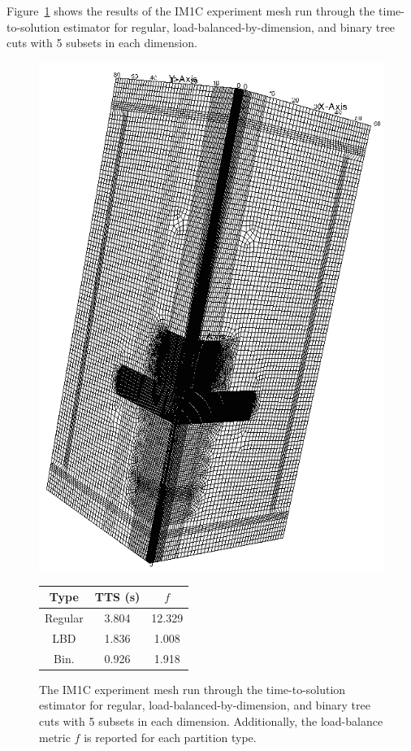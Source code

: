 Figure~\ref{im1c_opt} shows the results of the IM1C experiment mesh run through the time-to-solution estimator for regular, load-balanced-by-dimension, and binary tree cuts with 5 subsets in each dimension.
\begin{figure}[ht]
\begin{minipage}[c]{0.65\textwidth}
\centering
\includegraphics[scale=0.3]{../figures/im1_mesh.png}
\end{minipage}
%
\begin{minipage}[c]{0.33\textwidth}
\centering
\begin{table}[H]
\centering
\begin{tabular}{c|c|c}
\textbf{Type} & \bf TTS (s) & \bf $f$ \\ \hline
Regular & 3.804 & 12.329\\ \hline
LBD & 1.836 & 1.008\\ \hline
Bin. & 0.926 & 1.918\\ \hline
\end{tabular}
\end{table}
\end{minipage}
\caption{The IM1C experiment mesh run through the time-to-solution estimator for regular, load-balanced-by-dimension, and binary tree cuts with 5 subsets in each dimension. Additionally, the load-balance metric $f$ is reported for each partition type.}
\label{im1c_opt}
\end{figure}
